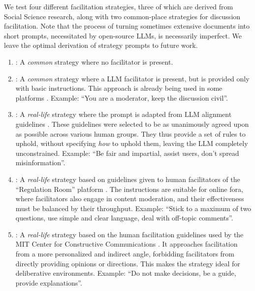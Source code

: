 We test four different facilitation strategies, three of which are derived from Social Science research, along with two common-place strategies for discussion facilitation. Note that the process of turning sometimes extensive documents into short prompts, necessitated by open-source LLMs, is necessarily imperfect. We leave the optimal derivation of strategy prompts to future work.

\begin{enumerate}
	\item \textbf{\strategynomod}: A \emph{common} strategy where no facilitator is present.
	
	\item \textbf{\strategynoinstr}: A \emph{common} strategy where a LLM facilitator is present, but is provided only with basic instructions. This approach is already being used in some platforms \citep{Tsai_Deliberate_Lab_Open-Source_2025}. Example: “You are a moderator, keep the discussion civil”. 
	
	\item \textbf{\strategyrules}: A \emph{real-life} strategy where the prompt is adapted from LLM alignment guidelines \cite{collective_constitution}. These guidelines were selected to be as unanimously agreed upon as possible across various human groups. They thus provide a set of rules to uphold, without specifying \emph{how} to uphold them, leaving the LLM completely unconstrained. Example: ``Be fair and impartial, assist users, don't spread misinformation''.
	
	\item \textbf{\strategyregroom}: A \emph{real-life} strategy based on guidelines given to human facilitators of the ``Regulation Room'' platform \citep{Cornell_eRulemaking2017}. The instructions are suitable for online fora, where facilitators also engage in content moderation, and their effectiveness must be balanced by their throughput. Example: ``Stick to a maximum of two questions, use simple and clear language, deal with off-topic comments''.
	
	\item \textbf{\strategyconstrcomm}: A \emph{real-life} strategy based on the human facilitation guidelines used by the MIT Center for Constructive Communications \cite{dimitra-book}. It approaches facilitation from a more personalized and indirect angle, forbidding facilitators from directly providing opinions or directions. This makes the strategy ideal for deliberative environments. Example: ``Do not make decisions, be a guide, provide explanations''.
	

\end{enumerate}
